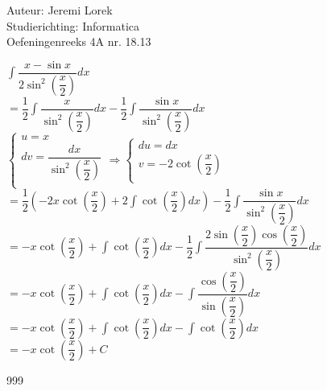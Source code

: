 \documentclass[a4paper]{article}
\begin{document}
\noindent \large Auteur: Jeremi Lorek\\
\noindent \large Studierichting: Informatica\\
\noindent \large Oefeningenreeks 4A nr. 18.13\\

\medskip
\normalsize

$\displaystyle \int \dfrac{x - \sin x}{2 \sin^2 \left( \dfrac{x}{2} \right)} dx$ \\

$= \dfrac{1}{2} \displaystyle \int \dfrac{x}{\sin^2 \left( \dfrac{x}{2} \right)} dx - \dfrac{1}{2} \int \dfrac{\sin x}{\sin^2 \left( \dfrac{x}{2} \right)} dx$ \\

$
\left\{
   \begin{array}{l}
       u = x \\
       dv = \dfrac{dx}{\sin^2 \left( \dfrac{x}{2} \right)} \\
   \end{array}
\right.
\Rightarrow
\left\{
   \begin{array}{l}
       du = dx \\
       v = -2 \cot \left( \dfrac{x}{2} \right) \\
   \end{array}
\right.
$ \\

$= \dfrac{1}{2} \left( -2x \cot \left( \dfrac{x}{2} \right) + 2 \displaystyle \int \cot \left( \dfrac{x}{2} \right) dx \right) - \dfrac{1}{2} \displaystyle \int \dfrac{\sin x}{\sin^2 \left( \dfrac{x}{2} \right)} dx$ \\

$= -x \cot \left( \dfrac{x}{2} \right) + \displaystyle \int \cot \left( \dfrac{x}{2} \right) dx - \dfrac{1}{2} \int \dfrac{2 \sin \left( \dfrac{x}{2} \right) \cos \left( \dfrac{x}{2} \right)}{\sin^2 \left( \dfrac{x}{2} \right)} dx$ \\

$= -x \cot \left( \dfrac{x}{2} \right) + \displaystyle \int \cot \left( \dfrac{x}{2} \right) dx - \int \dfrac{\cos \left( \dfrac{x}{2} \right)}{\sin \left( \dfrac{x}{2} \right)} dx$ \\

$= -x \cot \left( \dfrac{x}{2} \right) + \displaystyle \int \cot \left( \dfrac{x}{2} \right) dx - \int \cot \left( \dfrac{x}{2} \right) dx$ \\

$= -x \cot \left( \dfrac{x}{2} \right) + C $ \\

\begin{thebibliography}{999}
\end{thebibliography}
\end{document}
